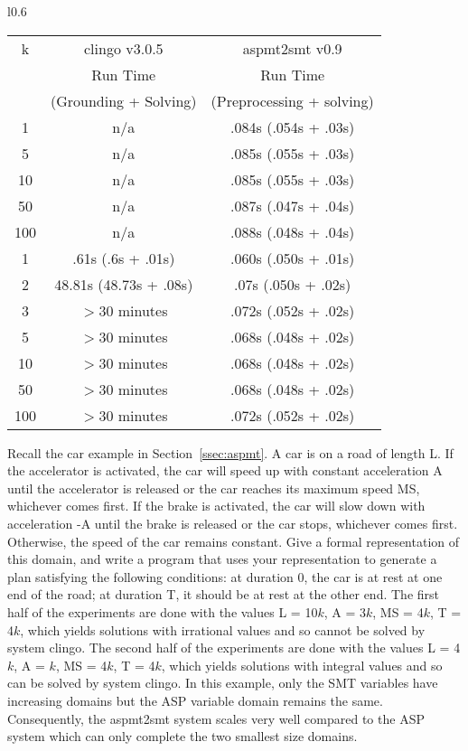 \documentclass[runningheads]{llncs}
\begin{document}
\begin{wrapfigure}{l}{0.6\textwidth}
{\footnotesize
\begin{tabular}{|c|c|c|}
\hline 
k & {\sc clingo} v3.0.5  & {\sc aspmt2smt} v0.9 \\ 
 &  Run Time   & Run Time  \\ 
 & (Grounding + Solving) & (Preprocessing + solving) \\ \hline\hline
1 & n/a & .084s (.054s + .03s) \\\hline
5 & n/a & .085s (.055s + .03s) \\\hline
10 & n/a & .085s (.055s + .03s) \\\hline
50 & n/a & .087s (.047s + .04s) \\\hline
100 & n/a & .088s (.048s + .04s) \\\hline\hline

1 & .61s (.6s + .01s) & .060s (.050s + .01s) \\\hline
2 & 48.81s (48.73s + .08s) & .07s (.050s + .02s) \\\hline
3 & $>30$ minutes & .072s (.052s + .02s) \\\hline
5 & $>30$ minutes & .068s (.048s + .02s)\\\hline
10 & $>30$ minutes & .068s (.048s + .02s) \\\hline
50 & $>30$ minutes & .068s (.048s + .02s)  \\\hline
100 & $>30$ minutes & .072s (.052s + .02s) \\\hline
\end{tabular}
}
\end{wrapfigure}

Recall the car example in Section~\ref{ssec:aspmt}. 
\BOCC
A car is on a road of length L.  If the accelerator is activated, the
car will speed up with constant acceleration A until the accelerator is
released or the car reaches its maximum speed MS, whichever comes first.
If the brake is activated, the car will slow down with acceleration -A
until the brake is released or the car stops, whichever comes first.
Otherwise, the speed of the car remains constant.
Give a formal representation of this domain, and write a program that
uses your representation to generate a plan satisfying the following
conditions:  at duration 0, the car is at rest at one end of the road; at
duration T, it should be at rest at the other end.
\EOCC
The first half of the experiments are done with the values L = 10$k$, A = 3$k$, MS = 4$k$, T = 4$k$, which yields solutions with irrational values and so cannot be solved by system {\sc clingo}.
The second half of the  experiments are done with the values L = 4$k$, A = $k$, MS = 4$k$, T = 4$k$, which yields solutions with integral values and so can be solved by system {\sc clingo}. In this example, only the SMT variables have increasing domains but the ASP variable domain remains the same. Consequently, the {\sc aspmt2smt} system scales very well compared to the ASP system which can only complete the two smallest size domains.
\end{document}
